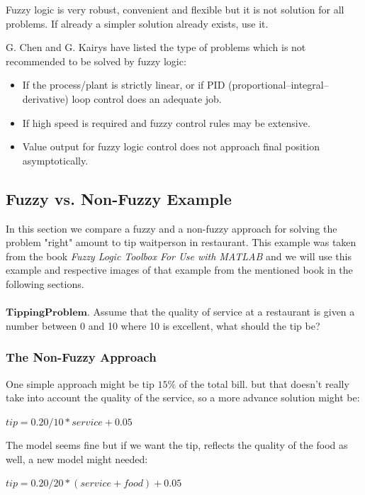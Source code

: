 \documentclass{article}
\begin{document}
Fuzzy logic is very robust, convenient and flexible but it is not solution for all problems. If already a simpler solution already exists, use it\citep{Fuzzy_Logic_Toolbox_For_Use_with_MATLAB}.

G. Chen and G. Kairys \cite{299142}  have listed the type of problems which is not recommended to be solved by fuzzy logic: 
\begin{itemize}
\item If the process/plant is strictly linear, or if PID (proportional–integral–derivative) loop control does an adequate job.
\item If high speed is required and fuzzy control rules may be extensive.
\item Value output for fuzzy logic control does not approach final position asymptotically.

\end{itemize}



\subsection{Fuzzy vs. Non-Fuzzy Example}\label{Fuzzy_vs._Non-Fuzzy_Example}
In this section we compare a fuzzy and a non-fuzzy approach for 
solving the problem "right" amount to tip waitperson in restaurant.
This example was taken from the book \textit{Fuzzy Logic Toolbox For Use with MATLAB}  \citep{Fuzzy_Logic_Toolbox_For_Use_with_MATLAB}
and we will use this example and respective images of that example from the mentioned book in the following sections.
\\
\\
$\mathbf{Tipping Problem} $. Assume that the quality of service at a restaurant is given a number between 0 and 10 where 10 is excellent, what should the tip be?

\subsubsection{The Non-Fuzzy Approach}
One simple approach might be tip $\mathit{15\% } $ of the total bill.
but that doesn't really take into account the quality of the service, 
so a more advance solution might be:\\
\begin{center} 
$tip=0.20/10*service+0.05$ 
\end{center}

The model seems fine but if we want the tip, reflects the quality of the food
as well, a new model might needed:\\
\begin{center} 
$tip = 0.20/20*(service+food)+0.05$ 
\end{center}
\end{document}
